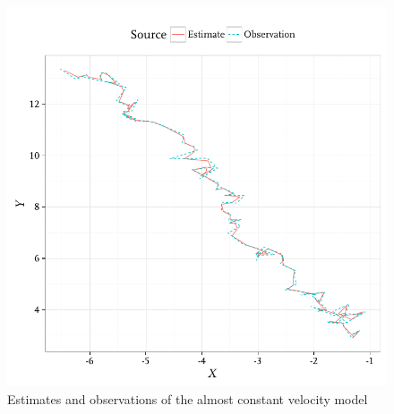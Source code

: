 \begin{figure}
  \includegraphics{fig/pf}
  \caption{Estimates and observations of the almost constant velocity model}
  \label{fig:pf}
\end{figure}

